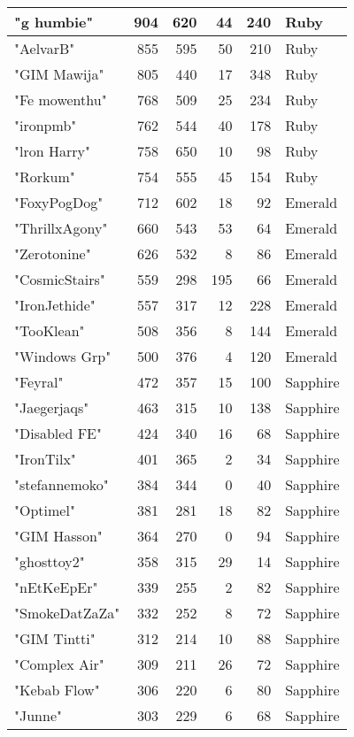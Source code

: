 \documentclass{article}
\begin{document}
\begin{table}[htbp]
\begin{tabular}{|l|r|r|r|r|l|}
"g humbie" & 904 & 620 & 44 & 240 & Ruby \\ \hline
"AelvarB" & 855 & 595 & 50 & 210 & Ruby \\ \hline
"GIM Mawija" & 805 & 440 & 17 & 348 & Ruby \\ \hline
"Fe mowenthu" & 768 & 509 & 25 & 234 & Ruby \\ \hline
"ironpmb" & 762 & 544 & 40 & 178 & Ruby \\ \hline
"lron Harry" & 758 & 650 & 10 & 98 & Ruby \\ \hline
"Rorkum" & 754 & 555 & 45 & 154 & Ruby \\ \hline
"FoxyPogDog" & 712 & 602 & 18 & 92 & Emerald \\ \hline
"ThrillxAgony" & 660 & 543 & 53 & 64 & Emerald \\ \hline
"Zerotonine" & 626 & 532 & 8 & 86 & Emerald \\ \hline
"CosmicStairs" & 559 & 298 & 195 & 66 & Emerald \\ \hline
"IronJethide" & 557 & 317 & 12 & 228 & Emerald \\ \hline
"TooKlean" & 508 & 356 & 8 & 144 & Emerald \\ \hline
"Windows Grp" & 500 & 376 & 4 & 120 & Emerald \\ \hline
"Feyral" & 472 & 357 & 15 & 100 & Sapphire \\ \hline
"Jaegerjaqs" & 463 & 315 & 10 & 138 & Sapphire \\ \hline
"Disabled FE" & 424 & 340 & 16 & 68 & Sapphire \\ \hline
"IronTilx" & 401 & 365 & 2 & 34 & Sapphire \\ \hline
"stefannemoko" & 384 & 344 & 0 & 40 & Sapphire \\ \hline
"Optimel" & 381 & 281 & 18 & 82 & Sapphire \\ \hline
"GIM Hasson" & 364 & 270 & 0 & 94 & Sapphire \\ \hline
"ghosttoy2" & 358 & 315 & 29 & 14 & Sapphire \\ \hline
"nEtKeEpEr" & 339 & 255 & 2 & 82 & Sapphire \\ \hline
"SmokeDatZaZa" & 332 & 252 & 8 & 72 & Sapphire \\ \hline
"GIM Tintti" & 312 & 214 & 10 & 88 & Sapphire \\ \hline
"Complex Air" & 309 & 211 & 26 & 72 & Sapphire \\ \hline
"Kebab Flow" & 306 & 220 & 6 & 80 & Sapphire \\ \hline
"Junne" & 303 & 229 & 6 & 68 & Sapphire \\ \hline

\end{tabular}
\end{table}
\end{document}
